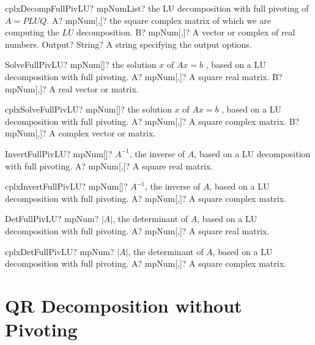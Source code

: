 \documentclass[12pt,a4paper,openany]{book}
\begin{document}
\begin{mpFunctionsExtract}
\mpFunctionThree
{cplxDecompFullPivLU? mpNumList? the LU decomposition with full pivoting of $A = PLUQ$.}
{A? mpNum[,]? the square complex matrix of which we are computing the $LU$ decomposition.}
{B? mpNum[,]? A vector or complex of real numbers.}
{Output? String? A string specifying the output options.}
\end{mpFunctionsExtract}

\begin{mpFunctionsExtract}
\mpFunctionTwo
{SolveFullPivLU? mpNum[]? the solution $x$ of $A x = b$ , based on a LU decomposition with full pivoting.}
{A? mpNum[,]? A square real matrix.}
{B? mpNum[,]? A real vector or matrix.}
\end{mpFunctionsExtract}

\begin{mpFunctionsExtract}
\mpFunctionTwo
{cplxSolveFullPivLU? mpNum[]? the solution $x$ of $A x = b$ , based on a LU decomposition with full pivoting.}
{A? mpNum[,]? A square complex matrix.}
{B? mpNum[,]? A complex vector or matrix.}
\end{mpFunctionsExtract}

\begin{mpFunctionsExtract}
\mpFunctionOne
{InvertFullPivLU? mpNum[]? $A^{-1}$, the inverse of $A$, based on a LU decomposition with full pivoting.}
{A? mpNum[,]? A square real matrix.}
\end{mpFunctionsExtract}

\begin{mpFunctionsExtract}
\mpFunctionOne
{cplxInvertFullPivLU? mpNum[]? $A^{-1}$, the inverse of $A$, based on a LU decomposition with full pivoting.}
{A? mpNum[,]? A square complex matrix.}
\end{mpFunctionsExtract}

\begin{mpFunctionsExtract}
\mpFunctionOne
{DetFullPivLU? mpNum? $|A|$, the determinant of $A$, based on a LU decomposition with full pivoting.}
{A? mpNum[,]? A square real matrix.}
\end{mpFunctionsExtract}

\begin{mpFunctionsExtract}
\mpFunctionOne
{cplxDetFullPivLU? mpNum? $|A|$, the determinant of $A$, based on a LU decomposition with full pivoting.}
{A? mpNum[,]? A square complex matrix.}
\end{mpFunctionsExtract}

\section{QR Decomposition without Pivoting}
\end{document}
